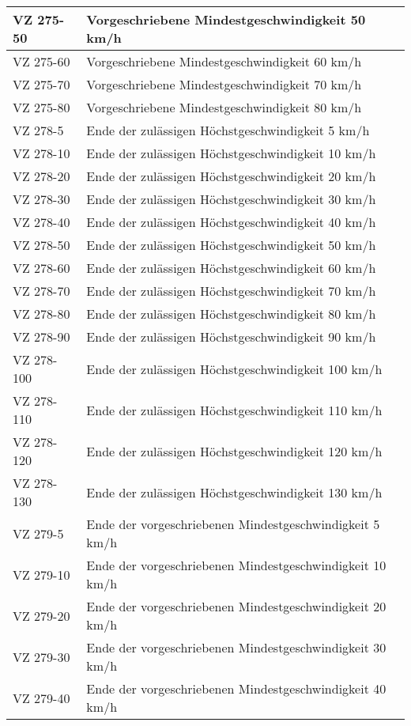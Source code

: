 \begin{appendix}
\begin{longtabu}{l X[j]}
\gls{VZ}	275-50	& Vorgeschriebene Mindestgeschwindigkeit 50 km/h\\ \hline
\gls{VZ}	275-60	& Vorgeschriebene Mindestgeschwindigkeit 60 km/h\\ \hline
\gls{VZ}	275-70	& Vorgeschriebene Mindestgeschwindigkeit 70 km/h\\ \hline
\gls{VZ}	275-80	& Vorgeschriebene Mindestgeschwindigkeit 80 km/h\\ \hline
\gls{VZ}	278-5	& Ende der zulässigen Höchstgeschwindigkeit 5 km/h\\ \hline
\gls{VZ}	278-10	& Ende der zulässigen Höchstgeschwindigkeit 10 km/h\\ \hline
\gls{VZ}	278-20	& Ende der zulässigen Höchstgeschwindigkeit 20 km/h\\ \hline
\gls{VZ}	278-30	& Ende der zulässigen Höchstgeschwindigkeit 30 km/h\\ \hline
\gls{VZ}	278-40	& Ende der zulässigen Höchstgeschwindigkeit 40 km/h\\ \hline
\gls{VZ}	278-50	& Ende der zulässigen Höchstgeschwindigkeit 50 km/h\\ \hline
\gls{VZ}	278-60	& Ende der zulässigen Höchstgeschwindigkeit 60 km/h\\ \hline
\gls{VZ}	278-70	& Ende der zulässigen Höchstgeschwindigkeit 70 km/h\\ \hline
\gls{VZ}	278-80	& Ende der zulässigen Höchstgeschwindigkeit 80 km/h\\ \hline
\gls{VZ}	278-90	& Ende der zulässigen Höchstgeschwindigkeit 90 km/h\\ \hline
\gls{VZ}	278-100	& Ende der zulässigen Höchstgeschwindigkeit 100 km/h\\ \hline
\gls{VZ}	278-110	& Ende der zulässigen Höchstgeschwindigkeit 110 km/h\\ \hline
\gls{VZ}	278-120	& Ende der zulässigen Höchstgeschwindigkeit 120 km/h\\ \hline
\gls{VZ}	278-130	& Ende der zulässigen Höchstgeschwindigkeit 130 km/h\\ \hline
\gls{VZ}	279-5   & Ende der vorgeschriebenen Mindestgeschwindigkeit 5 km/h\\ \hline
\gls{VZ}	279-10  & Ende der vorgeschriebenen Mindestgeschwindigkeit 10 km/h\\ \hline
\gls{VZ}	279-20	& Ende der vorgeschriebenen Mindestgeschwindigkeit 20 km/h\\ \hline
\gls{VZ}	279-30	& Ende der vorgeschriebenen Mindestgeschwindigkeit 30 km/h\\ \hline
\gls{VZ}	279-40	& Ende der vorgeschriebenen Mindestgeschwindigkeit 40 km/h\\ \hline

\end{longtabu}
\end{appendix}

